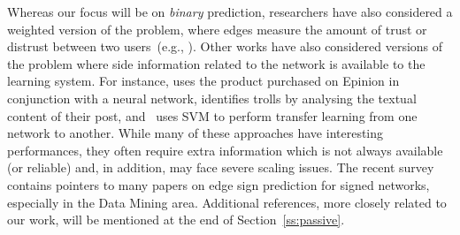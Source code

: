 Whereas our focus will be on {\em binary} prediction, researchers have also considered a weighted version of the problem, where edges measure the amount of trust or distrust between two users~(e.g., \cite{guha2004propagation,Tang2013,
Qian2014sn}). Other works have also considered versions of the problem where side information related to the network is available to the learning system. For instance, \cite{EdgeSignsRating15} uses the product purchased on Epinion in conjunction with a neural network, \cite{TrollDetection15} identifies trolls by analysing the textual content of their post, and~\cite{SNTransfer13} uses SVM to perform transfer learning from one network to another. While many of these approaches have interesting performances, they often require extra information which is not always available (or reliable) and, in addition, may face severe scaling issues.
The recent survey~\cite{Tang2015a} contains pointers to many papers on edge sign prediction for signed networks, especially in the Data Mining area. Additional references, more closely related to our work, will be mentioned at the end of Section~\ref{ss:passive}.



